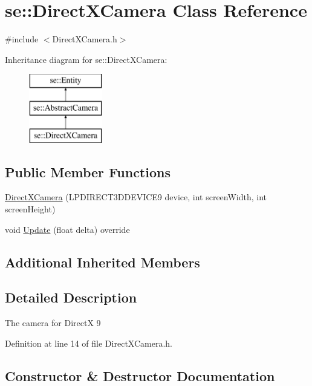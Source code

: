 \hypertarget{classse_1_1_direct_x_camera}{}\section{se\+:\+:Direct\+X\+Camera Class Reference}
\label{classse_1_1_direct_x_camera}


{\ttfamily \#include $<$Direct\+X\+Camera.\+h$>$}

Inheritance diagram for se\+:\+:Direct\+X\+Camera\+:\begin{figure}[H]
\begin{center}
\leavevmode
\includegraphics[height=3.000000cm]{classse_1_1_direct_x_camera}
\end{center}
\end{figure}
\subsection*{Public Member Functions}
\begin{DoxyCompactItemize}
\item 
\mbox{\hyperlink{classse_1_1_direct_x_camera_ab64cc6b55e6166b87ff83345137aaab3}{Direct\+X\+Camera}} (L\+P\+D\+I\+R\+E\+C\+T3\+D\+D\+E\+V\+I\+C\+E9 device, int screen\+Width, int screen\+Height)
\item 
void \mbox{\hyperlink{classse_1_1_direct_x_camera_ae313a5d5a4d2c1b88e5f40285b31b921}{Update}} (float delta) override
\end{DoxyCompactItemize}
\subsection*{Additional Inherited Members}


\subsection{Detailed Description}
The camera for DirectX 9 

Definition at line 14 of file Direct\+X\+Camera.\+h.



\subsection{Constructor \& Destructor Documentation}
\mbox{\label{classse_1_1_direct_x_camera_ab64cc6b55e6166b87ff83345137aaab3}} 

